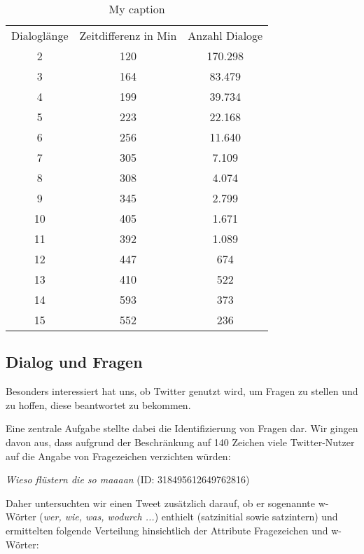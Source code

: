 \documentclass[main.tex]{subfiles}
\begin{document}
\begin{table}[h]
\centering
\begin{tabular}{ccc}
Dialoglänge & Zeitdifferenz in Min & Anzahl Dialoge \\
2           & 120                  & 170.298        \\
3           & 164                  & 83.479         \\
4           & 199                  & 39.734         \\
5           & 223                  & 22.168         \\
6           & 256                  & 11.640         \\
7           & 305                  & 7.109          \\
8           & 308                  & 4.074          \\
9           & 345                  & 2.799          \\
10          & 405                  & 1.671          \\
11          & 392                  & 1.089          \\
12          & 447                  & 674            \\
13          & 410                  & 522            \\
14          & 593                  & 373            \\
15          & 552                  & 236           
\end{tabular}
\caption{My caption}
\label{my-label}
\end{table}



\subsection{Dialog und Fragen}

Besonders interessiert hat uns, ob Twitter genutzt wird, um Fragen zu stellen und zu hoffen, diese beantwortet zu bekommen. 

Eine zentrale Aufgabe stellte dabei die Identifizierung von Fragen dar. Wir gingen davon aus, dass aufgrund der Beschränkung auf 140 Zeichen viele Twitter-Nutzer auf die Angabe von Fragezeichen verzichten würden:

\textit{Wieso flüstern die so maaaan} (ID: 318495612649762816)


Daher untersuchten wir einen Tweet zusätzlich darauf, ob er sogenannte w-Wörter (\textit{wer, wie, was, wodurch ...}) enthielt (satzinitial sowie satzintern) und ermittelten folgende Verteilung hinsichtlich der Attribute Fragezeichen und w-Wörter:
\end{document}
